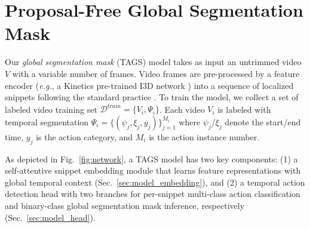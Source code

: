 \documentclass[runningheads]{llncs}
\newcommand{\eg}{\textit{e.g.}}
\newcommand{\shortmodelname}{TAGS}
\begin{document}
\section{Proposal-Free Global Segmentation Mask}
\label{sec:method}
Our {\em global segmentation mask} ({\shortmodelname}) model
takes as input an untrimmed video
$V$ with a variable number of frames.
Video frames are pre-processed by a feature encoder 
(\eg, a Kinetics pre-trained I3D network \cite{carreira2017quo})
into a sequence of localized snippets following the standard practice \cite{lin2019bmn}.
To train the model, we collect a set of labeled 
video training set $\mathcal{D}^{train} = \{V_i, \Psi_i\}$. Each video $V_i$ is labeled with temporal segmentation 
$\Psi_i = \{(\psi_j, \xi_j, y_j)\}_{j=1}^{M_i}$
where $\psi_{j}$/$\xi_{j}$ denote 
the start/end time, $y_j$ is the action category,
and $M_i$ is the action instance number. 

As depicted in Fig.~\ref{fig:network}, a {\shortmodelname} model
has two key components:
(1) a self-attentive snippet embedding module
that learns feature representations with global temporal context (Sec.~\ref{sec:model_embedding}),
and
(2) a temporal action detection head with two branches
for per-snippet multi-class action classification 
and binary-class global segmentation mask inference, respectively
 (Sec.~\ref{sec:model_head}).
 
\end{document}
